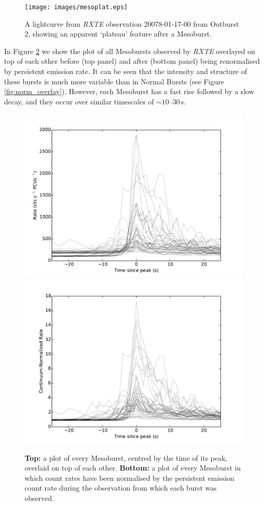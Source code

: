 \begin{figure}
  \centering
  \texttt{[image: images/mesoplat.eps]}
  \caption{\small A lightcurve from \textit{RXTE} observation 20078-01-17-00 from Outburst 2, showing an apparent `plateau' feature after a Mesoburst.}
  \label{fig:mesoplateau}
\end{figure}

\par In Figure \ref{fig:meso_over} we show the plot of all Mesobursts observed by \textit{RXTE} overlayed on top of each other before (top panel) and after (bottom panel) being renormalised by persistent emission rate.  It can be seen that the intensity and structure of these bursts is much more variable than in Normal Bursts (see Figure \ref{fig:norm_overlay}).  However, each Mesoburst has a fast rise followed by a slow decay, and they occur over similar timescales of $\sim10$--$30$\,s.

\begin{figure}
  \centering
  \includegraphics[width=.9\linewidth, trim={0.4cm 0 1.1cm 0},clip]{images/1000meso.pdf}
  \includegraphics[width=.9\linewidth, trim={0.4cm 0 1.1cm 0},clip]{images/1000meso_renormed.pdf}
  \caption{\small  \textbf{Top:} a plot of every Mesoburst, centred by the time of its peak, overlaid on top of each other.  \textbf{Bottom:} a plot of every Mesoburst in which count rates have been normalised by the persistent emission count rate during the observation from which each burst was observed.}
  \label{fig:meso_over}
\end{figure}

